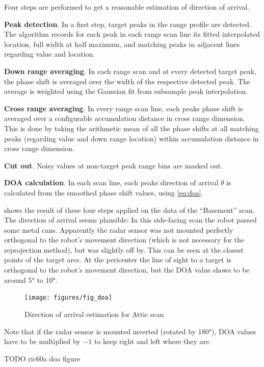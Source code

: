 Four steps are performed to get a reasonable estimation of direction of
arrival.

\textbf{Peak detection}. In a first step, target peaks in the
range profile are detected. The algorithm records for each peak in each
range scan line its fitted interpolated location, full width at half
maximum, and matching peaks in adjacent lines regarding value and
location.

\textbf{Down range averaging}. In each range scan and at every
detected target peak, the phase shift is averaged over the width of the
respective detected peak. The average is weighted using the Gaussian fit
from subsample peak interpolation.

\textbf{Cross range averaging}. In
every range scan line, each peaks phase shift is averaged over a
configurable accumulation distance in cross range dimension. This is
done by taking the arithmetic mean of all the phase shifts at all
matching peaks (regarding value and down range location) within
accumulation distance in cross range dimension.

\textbf{Cut out}. Noisy
values at non-target peak range bins are masked out.

\textbf{DOA calculation}. In each scan line, each peaks direction of arrival
\(\theta\) is calculated from the smoothed phase shift values, using \cref{eq:doa}.

 shows the result of these four steps applied on the data of
the ``Basement'' scan. The direction of arrival seems plausible: In this
side-facing scan the robot passed some metal cans. Apparently the radar
sensor was not mounted perfectly orthogonal to the robot's movement
direction (which is not necessary for the reprojection method), but was
slightly off by. This can be seen at the closest points of the target
arcs. At the pericenter the line of sight to a target is orthogonal to
the robot's movement direction, but the DOA value shows to be around \ang{5}
to \ang{10}.

\begin{figure}[htbp]
    \centering
    \texttt{[image: figures/fig\_doa]}
    \caption{Direction of arrival estimation for Attic scan}
    \label{fig:fig_doa}
\end{figure}

Note that if the radar sensor is mounted inverted (rotated by \ang{180}), DOA
values have to be multiplied by \(-1\) to keep right and left where they
are.

TODO ric60a doa figure

